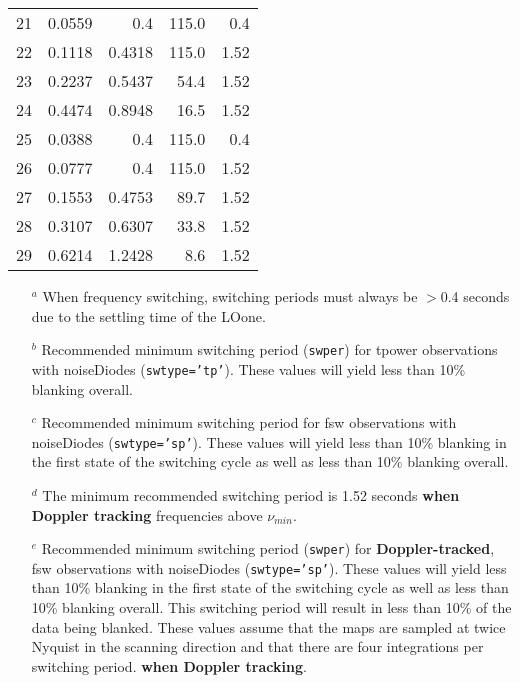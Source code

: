 \begin{table}[!h]
\begin{small}
\begin{center}
\begin{tabular}{cdddd}
21 &0.0559 & 0.4    & 115.0  & 0.4 \\
22 &0.1118 & 0.4318 & 115.0  & 1.52 \\
23 &0.2237 & 0.5437 & 54.4 & 1.52 \\
24 &0.4474 & 0.8948 & 16.5 & 1.52 \\
25 &0.0388 & 0.4    & 115.0  & 0.4 \\
26 &0.0777 & 0.4    & 115.0  & 1.52 \\
27 &0.1553 & 0.4753 & 89.7 & 1.52 \\
28 &0.3107 & 0.6307 & 33.8 & 1.52 \\
29 &0.6214 & 1.2428 & 8.6  & 1.52 \\

\bottomrule
\end{tabular}
\end{center}
\end{small}
\end{table}
\begin{footnotesize}
\begin{itemize}[itemsep=0pt]
\item[$^a$] When frequency switching, switching periods must always be $>$0.4 seconds
due to the settling time of the \gls{LOone}.
\item[$^b$] Recommended minimum switching period ({\tt swper}) for \gls{tpower}
observations with \glspl{noiseDiode} ({\tt swtype='tp'}). These values will yield less
than 10\% blanking overall.
\item[$^c$] Recommended minimum switching period for \gls{fsw} observations with
\glspl{noiseDiode} ({\tt swtype='sp'}). These values will yield less than
10\% blanking in the first state of the switching cycle as well as less than
10\% blanking overall.
\item[$^d$] The minimum recommended switching period is 1.52 seconds {\bf when Doppler tracking}
frequencies above $\nu_{min}$.
\item[$^e$] Recommended minimum switching period ({\tt swper}) for {\bf Doppler-tracked}, \gls{fsw}
observations with \glspl{noiseDiode} ({\tt swtype='sp'}). These values will yield less than 10\%
blanking in the first state of the switching cycle as well as less than 10\% blanking overall.
This switching period will result in less than 10\% of the data being blanked. These values
assume that the maps are sampled at twice Nyquist in the scanning direction and that there are four
integrations per switching period.
{\bf when Doppler tracking}.
\end{itemize}
\end{footnotesize}
\newpage

